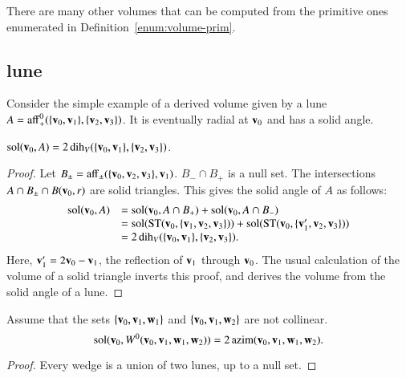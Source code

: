 There are many other volumes that can be computed from the
primitive ones enumerated in Definition~\ref{enum:volume-prim}.

\subsection{lune}  
%

Consider the simple example of a derived volume given by a
lune $A={\operatorname{aff}}_+^0(\{{\mathbf v}_0,{\mathbf v}_1\},\{{\mathbf v}_2,{\mathbf v}_3\})$.  It is eventually
radial at ${\mathbf v}_0$ and has a solid angle.
%

\begin{lemma} $\operatorname{sol}({\mathbf v}_0,A) =
2\operatorname{dih}_V(\{{\mathbf v}_0,{\mathbf v}_1\},\{{\mathbf v}_2,{\mathbf v}_3\})$.
\end{lemma}

\begin{proof}
Let $B_{\pm} = {\operatorname{aff}}_\pm(\{{\mathbf v}_0,{\mathbf v}_2,{\mathbf v}_3\},{\mathbf v}_1)$.  $B_- \cap B_+$
is a null set.  The intersections $A\cap B_{\pm}\cap B({\mathbf v}_0,r)$ 
are solid triangles.  This gives the solid angle of $A$ as
follows:
\begin{displaymath}\begin{array}{lll}
\operatorname{sol}({\mathbf v}_0,A) &= \operatorname{sol}({\mathbf v}_0,A\cap B_+)+\operatorname{sol}({\mathbf v}_0,A\cap B_-) \\
&= 
\operatorname{sol}({\operatorname{ST}}({\mathbf v}_0,\{{\mathbf v}_1,{\mathbf v}_2,{\mathbf v}_3\})) + \operatorname{sol}({\operatorname{ST}}({\mathbf v}_0,\{{\mathbf v}_1',{\mathbf v}_2,{\mathbf v}_3\})) \\
&=
2\operatorname{dih}_V(\{{\mathbf v}_0,{\mathbf v}_1\},\{{\mathbf v}_2,{\mathbf v}_3\}).
\end{array}
\end{displaymath}
Here,  ${\mathbf v}_1'= 2 {\mathbf v}_0 - {\mathbf v}_1$, the reflection of ${\mathbf v}_1$
through ${\mathbf v}_0$.  The usual calculation of the volume of a solid triangle
inverts this proof, 
and derives the volume from the solid angle of a lune.
\end{proof}



\begin{lemma} 
Assume that the sets $\{{\mathbf v}_0,{\mathbf v}_1,{\mathbf w}_1\}$ and
$\{{\mathbf v}_0,{\mathbf v}_1,{\mathbf w}_2\}$ are not collinear. 
\begin{displaymath}
\operatorname{sol}({\mathbf v}_0,W^0({\mathbf v}_0,{\mathbf v}_1,{\mathbf w}_1,{\mathbf w}_2)) = 2\,{\operatorname{azim}}({\mathbf v}_0,{\mathbf v}_1,{\mathbf w}_1,{\mathbf w}_2).
\end{displaymath}
%
\end{lemma}    

\begin{proof} Every wedge is a union of two lunes, up to a null set.
\end{proof}

